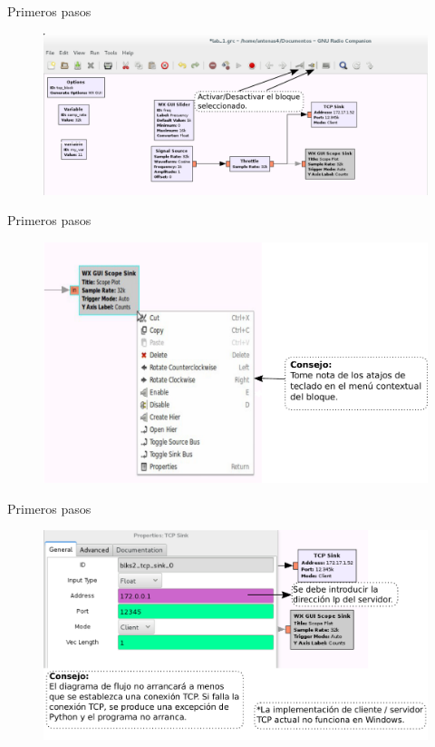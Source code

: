\begin{frame}{Primeros pasos }
\begin{figure}[H]
\centering
\includegraphics[width=\textwidth]{parte1/lab1/pdf/lab1_22.pdf}
\end{figure}
\end{frame}

\begin{frame}{Primeros pasos }
\begin{figure}[H]
\centering
\includegraphics[width=\textwidth, height=0.6\textwidth]{parte1/lab1/pdf/lab1_23.pdf}
\end{figure}
\end{frame}

\begin{frame}{Primeros pasos }
\begin{figure}[H]
\centering
\includegraphics[width=\textwidth]{parte1/lab1/pdf/lab1_24.pdf}
\end{figure}
\end{frame}

